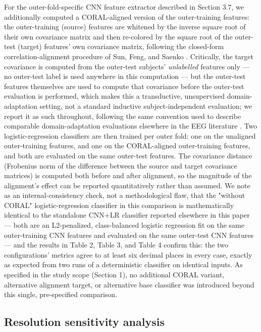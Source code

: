 \documentclass[a4paper,fleqn]{cas-sc}
\begin{document}
For the outer-fold-specific CNN feature extractor described in Section 3.7, we additionally computed a CORAL-aligned version of the outer-training features: the outer-training (source) features are whitened by the inverse square root of their own covariance matrix and then re-colored by the square root of the outer-test (target) features' own covariance matrix, following the closed-form correlation-alignment procedure of Sun, Feng, and Saenko \cite{sun2016return}. Critically, the target covariance is computed from the outer-test subjects' \textit{unlabelled} features only --- no outer-test label is used anywhere in this computation --- but the outer-test features themselves are used to compute that covariance before the outer-test evaluation is performed, which makes this a transductive, unsupervised domain-adaptation setting, not a standard inductive subject-independent evaluation; we report it as such throughout, following the same convention used to describe comparable domain-adaptation evaluations elsewhere in the EEG literature \cite{li2026crosssubject,zhong2023deep}. Two logistic-regression classifiers are then trained per outer fold: one on the unaligned outer-training features, and one on the CORAL-aligned outer-training features, and both are evaluated on the same outer-test features. The covariance distance (Frobenius norm of the difference between the source and target covariance matrices) is computed both before and after alignment, so the magnitude of the alignment's effect can be reported quantitatively rather than assumed. We note as an internal-consistency check, not a methodological flaw, that the "without CORAL" logistic-regression classifier in this comparison is mathematically identical to the standalone CNN+LR classifier reported elsewhere in this paper --- both are an L2-penalized, class-balanced logistic regression fit on the same outer-training CNN features and evaluated on the same outer-test CNN features --- and the results in Table 2, Table 3, and Table 4 confirm this: the two configurations' metrics agree to at least six decimal places in every case, exactly as expected from two runs of a deterministic classifier on identical inputs. As specified in the study scope (Section 1), no additional CORAL variant, alternative alignment target, or alternative base classifier was introduced beyond this single, pre-specified comparison.



\subsection{Resolution sensitivity analysis}
\end{document}
